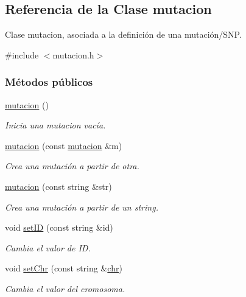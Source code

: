 \hypertarget{classmutacion}{}\subsection{Referencia de la Clase mutacion}
\label{classmutacion}


Clase mutacion, asociada a la definición de una mutación/\+S\+NP.  




{\ttfamily \#include $<$mutacion.\+h$>$}

\subsubsection*{Métodos públicos}
\begin{DoxyCompactItemize}
\item 
\hyperlink{classmutacion_a01cb8b2307eacbfb415f99373ff3c64a}{mutacion} ()
\begin{DoxyCompactList}\small\item\em Inicia una mutacion vacía. \end{DoxyCompactList}\item 
\hyperlink{classmutacion_a6bcb17c723a359ffac7dda8d5d427dfe}{mutacion} (const \hyperlink{classmutacion}{mutacion} \&m)
\begin{DoxyCompactList}\small\item\em Crea una mutación a partir de otra. \end{DoxyCompactList}\item 
\hyperlink{classmutacion_a8c5cc5b5146c511b9a1d6976156389c3}{mutacion} (const string \&str)
\begin{DoxyCompactList}\small\item\em Crea una mutación a partir de un string. \end{DoxyCompactList}\item 
void \hyperlink{classmutacion_af6288453d3cb4e29b8be304ca262b170}{set\+ID} (const string \&id)
\begin{DoxyCompactList}\small\item\em Cambia el valor de ID. \end{DoxyCompactList}\item 
void \hyperlink{classmutacion_a147ee1f35c78ab0b7cf891067bf2e336}{set\+Chr} (const string \&\hyperlink{classmutacion_a57651966b952f782240ff9cff72c5d2f}{chr})
\begin{DoxyCompactList}\small\item\em Cambia el valor del cromosoma. \end{DoxyCompactList}\item 

\end{DoxyCompactItemize}

